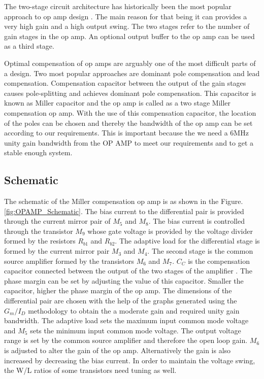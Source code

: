 The two-stage circuit architecture has historically been the most popular approach to op amp design \cite{opamp_basic}. The main reason for that being it can provides a very high gain and a high output swing. The two stages refer to the number of gain stages in the op amp. An optional output buffer to the op amp can be used as a third stage. 

Optimal compensation of op amps are arguably one of the most difficult parts of a design. Two most popular approaches are dominant pole compensation and lead compensation. Compensation capacitor between the output of the gain stages causes pole-splitting and achieves dominant pole compensation. This capacitor is known as Miller capacitor and the op amp is called as a two stage Miller compensation op amp. With the use of this compensation capacitor, the location of the poles can be chosen and thereby the bandwidth of the op amp can be set according to our requirements. This is important because the we need a 6MHz unity gain bandwidth from the OP AMP to meet our requirements and to get a stable enough system.

\subsection{Schematic}
The schematic of the Miller compensation op amp is as shown in the Figure.\ref{fig:OPAMP_Schematic}. The bias current to the differential pair is provided through the current mirror pair of $M_5$ and $M_8$. The bias current is controlled through the transistor $M_9$ whose gate voltage is provided by the voltage divider formed by the resistors $R_{b1}$ and $R_{b2}$. The adaptive load for the differential stage is formed by the current mirror pair $M_3$ and $M_4$. The second stage is the common source amplifier formed by the transistors $M_6$ and $M_7$. $C_C$ is the compensation capacitor connected between the output of the two stages of the amplifier \cite{aicd_opamp_design}. The phase margin can be set by adjusting the value of this capacitor.  Smaller the capacitor, higher the phase margin of the op amp. The dimensions of the differential pair are chosen with the help of the graphs generated using the $G_m/I_D$ methodology to obtain the a moderate gain and required unity gain bandwidth. The adaptive load sets the maximum input common mode voltage and $M_5$ sets the minimum input common mode voltage. The output voltage range is set by the common source amplifier and therefore the open loop gain. $M_6$ is adjusted to alter the gain of the op amp. Alternatively the gain is also increased by decreasing the bias current. In order to maintain the voltage swing, the W/L ratios of some transistors need tuning as well.

